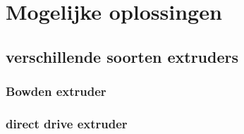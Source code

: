 \chapter{Mogelijke oplossingen}
\label{Mogelijke_oplossingen}

\section{verschillende soorten extruders}

\subsection{Bowden extruder}
\label{Bowden_extruder}

\subsection{direct drive extruder}
